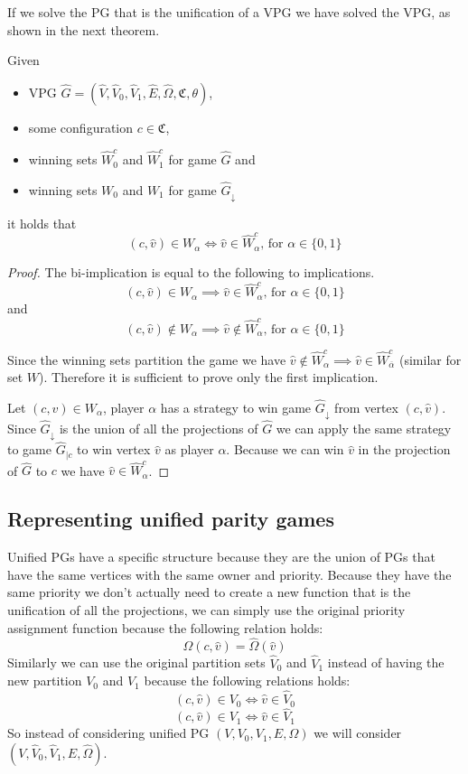 If we solve the PG that is the unification of a VPG we have solved the VPG, as shown in the next theorem.
\begin{theorem}
	\label{theA_solve_UVPG_is_solve_VPG}
	Given 
	\begin{itemize}
		\item VPG $\hat{G} =  (\hat{V},\hat{V}_0,\hat{V}_1, \hat{E},\hat{\Omega}, \mathfrak{C},\theta)$,
		\item some configuration $c \in \mathfrak{C}$,
		\item winning sets $\hat{W}^c_0$ and $\hat{W}^c_1$ for game $\hat{G}$ and
		\item winning sets $W_0$ and $W_1$ for game $\hat{G}_{\downarrow}$
	\end{itemize}
it holds that
	\[(c,\hat{v}) \in W_\alpha \iff \hat{v} \in \hat{W}^c_\alpha  \text{, for }\alpha \in \{0,1\}  \]
	\begin{proof}
		The bi-implication is equal to  the following to implications.
		\[ (c,\hat{v}) \in W_\alpha \implies \hat{v} \in \hat{W}^c_\alpha  \text{, for }\alpha \in \{0,1\} \]
		and
		\[ (c,\hat{v}) \notin W_\alpha\implies \hat{v} \notin \hat{W}^c_\alpha \text{, for }\alpha \in \{0,1\}  \]
		
		Since the winning sets partition the game we have $\hat{v} \notin \hat{W}^c_\alpha \implies \hat{v} \in \hat{W}^c_{\overline{\alpha}}$ (similar for set $W$). Therefore it is sufficient to prove only the first implication.
		
		Let $(c,\hat{v}) \in W_\alpha$, player $\alpha$ has a strategy to win game $\hat{G}_{\downarrow}$ from vertex $(c,\hat{v})$. Since $\hat{G}_{\downarrow}$ is the union of all the projections of $\hat{G}$ we can apply the same strategy to game $\hat{G}_{|c}$ to win vertex $\hat{v}$ as player $\alpha$. Because we can win $\hat{v}$ in the projection of $\hat{G}$ to $c$ we have $\hat{v} \in \hat{W}^c_\alpha$.
	\end{proof}
\end{theorem}

\subsection{Representing unified parity games}
Unified PGs have a specific structure because they are the union of PGs that have the same vertices with the same owner and priority. Because they have the same priority we don't actually need to create a new function that is the unification of all the projections, we can simply use the original priority assignment function because the following relation holds:
\[ \Omega(c,\hat{v}) = \hat{\Omega}(\hat{v}) \]
Similarly we can use the original partition sets $\hat{V}_0$ and $\hat{V}_1$ instead of having the new partition $V_0$ and $V_1$ because the following relations holds:
\[ (c,\hat{v}) \in V_0 \iff \hat{v}\in \hat{V}_0 \]
\[ (c,\hat{v}) \in V_1 \iff \hat{v}\in \hat{V}_1 \]
So instead of considering unified PG $(V,V_0,V_1,E,\Omega)$ we will consider $(V,\hat{V}_0,\hat{V}_1,E,\hat{\Omega})$. 

